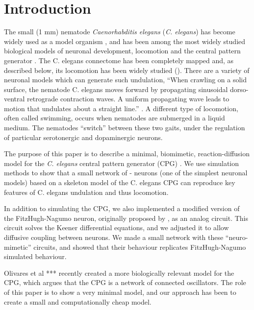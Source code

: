 \documentclass[
    11pt,
]{article}
\begin{document}
\section{Introduction}\label{sec: intro}


The small (1 mm) nematode \emph{Caenorhabditis elegans} (\emph{C. elegans}) has become widely used as a model organism \citep{corsi2015}, and has been among the most widely studied biological models of neuronal development, locomotion and the central pattern generator \citep{katz2016}.
The C. elegans connectome has been completely mapped \citep{jabr} and, as described below, its locomotion has been widely studied (\citet{corsi2015}).  There are a variety of neuronal models which can generate such undulation,
``When crawling on a solid surface, the nematode C. elegans moves forward by propagating sinusoidal dorso-ventral retrograde contraction waves.  A uniform propagating wave leads to motion that undulates about a straight line.'' \citep{kim2011}.
A different type of locomotion, often called swimming, occurs when nematodes are submerged in a liquid medium. The nematodes “switch” between these two gaits, under the regulation of particular serotonergic and dopaminergic neurons.

The purpose of this paper is to describe a minimal, biomimetic, reaction-diffusion model for the \emph{C. elegans} central pattern generator (CPG) \citep{xu2018, wen2012}.  We use simulation methods to show that a small network of \citet{fitzhugh1955}-\citet{nagumo1962} neurons (one of the simplest neuronal models) based on a skeleton model of the C. elegans CPG can reproduce key features of C. elegans undulation \citep{magnes2012} and thus locomotion.

In addition to simulating the CPG, we also implemented a modified version of the FitzHugh-Nagumo neuron, originally proposed by \citet{keener1983}, as an analog circuit.  This circuit solves the Keener differential equations, and we adjusted it to allow diffusive coupling between neurons.  We made a small network with these ``neuro-mimetic'' circuits, and showed that their behaviour replicates FitzHugh-Nagumo simulated behaviour.


Olivares et al *** recently created a more biologically relevant model for the CPG, which argues that the CPG is a network of connected oscillators.  The role of this paper is to show a very minimal model, and our approach has been to create a small and computationally cheap model.
\end{document}
